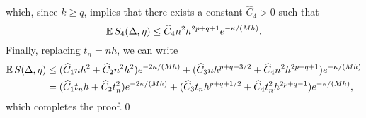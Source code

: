\documentclass[10pt]{article}
\begin{document}
	which, since $k \geq q$, implies that there exists a constant $\hat C_4 > 0$ such that 
	\begin{equation}
		\operatorname{\mathbb{E}} S_4(\Delta, \eta) \leq \widehat C_4 n^2 h^{2p+q+1}e^{-\kappa/(Mh)}.
	\end{equation}
	Finally, replacing $t_n = nh$, we can write
	\begin{equation}
	\begin{aligned}
		\operatorname{\mathbb{E}} S(\Delta, \eta) &\leq (\widehat C_1 n h^2 + \widehat C_2 n^2 h^2) e^{-2\kappa/(Mh)} + (\widehat C_3 n h^{p+q+3/2} + \widehat C_4 n^2 h^{2p+q+1})e^{-\kappa/(Mh)}\\
		&= (\widehat C_1 t_n h + \widehat C_2 t_n^2) e^{-2\kappa/(Mh)} + (\widehat C_3 t_n h^{p+q+1/2} + \widehat C_4 t_n^2 h^{2p+q-1})e^{-\kappa/(Mh)},
	\end{aligned}
	\end{equation}
	which completes the proof.\qed
	
\end{document}
